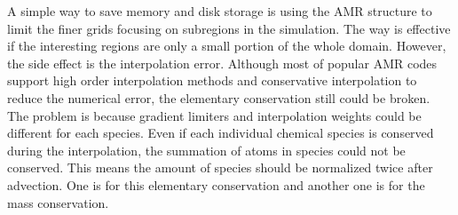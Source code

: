 A simple way to save memory and disk storage is using the AMR structure to limit the finer grids focusing on subregions in the simulation. The way is effective if the interesting regions are only a small portion of the whole domain. However, the side effect is the interpolation error. Although most of popular AMR codes support high order interpolation methods and conservative interpolation to reduce the numerical error, the elementary conservation still could be broken\cite{Grassi2017}. The problem is because gradient limiters and interpolation weights could be different for each species. Even if each individual chemical species is conserved during the interpolation, the summation of atoms in species could not be conserved. This means the amount of species should be normalized twice after advection. One is for this elementary conservation and another one is for the mass conservation.

